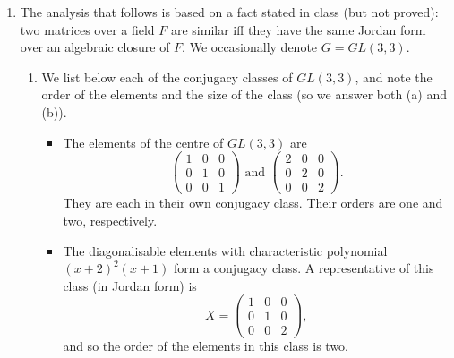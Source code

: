 \documentclass[11pt]{article} \usepackage{amssymb}
\begin{document}
\begin{enumerate}
\begin{enumerate}
  \end{enumerate}
  \item

    The analysis that follows is based on a fact stated in class (but not
    proved): two matrices over a field $F$ are similar iff they have the same
    Jordan form over an algebraic closure of $F$. We occasionally 
    denote $G=GL(3,3)$.
    \begin{enumerate}
    \item 
      We list below each of the conjugacy classes of $GL(3,3)$, and note
      the order of the elements and the size of the class (so we answer
      both (a) and (b)).
      \begin{itemize}
      \item The elements of the centre of $GL(3,3)$ are
        \begin{equation*}
          \begin{pmatrix}
            1&0  &0 \\ 
            0&1  &0 \\ 
            0&0  &1 
          \end{pmatrix}
          \mbox{ and }
          \begin{pmatrix}
            2&0  &0 \\ 
            0&2  &0 \\ 
            0&0  &2 
          \end{pmatrix}.
        \end{equation*}
        They are each in their own conjugacy class. Their orders are one
        and two, respectively. 
      \item
        The diagonalisable elements with characteristic polynomial $(x+2)^2(x+1)$
        form a conjugacy class. A representative of this class (in Jordan
        form) is
        \begin{equation*}
          X=
          \begin{pmatrix}
            1&0  &0 \\ 
            0&1  &0 \\ 
            0&0  &2 
          \end{pmatrix},
        \end{equation*}
        and so the order of the elements in this class is two.
        

\end{itemize}
\end{enumerate}
\end{enumerate}
\end{document}
